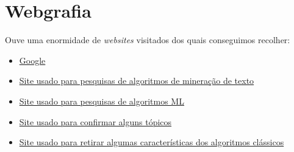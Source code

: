 \documentclass[a4paper,10pt]{article}
\begin{document}
\section{Webgrafia}

Ouve uma enormidade de \textit{websites} visitados dos quais conseguimos recolher:
\begin{itemize}
    \item \href{https://www.google.com/}{Google}
    \item \href{https://www.devmedia.com.br/mineracao-de-texto-analise-comparativa-de-algoritmos-revista-sql-magazine-138/34013}{Site usado para pesquisas de algoritmos de mineração de texto}
    \item \href{https://azure.microsoft.com/pt-pt/overview/machine-learning-algorithms/#overview}{Site usado para pesquisas de algoritmos ML}
    \item \href{https://rockcontent.com/br/blog/web-crawler/}{Site usado para confirmar alguns tópicos}
    \item \href{https://www.geekboots.com/story/classic-algorithm-vs-ml-algorithm}{Site usado para retirar algumas características dos algoritmos clássicos}
\end{itemize}
\end{document}
